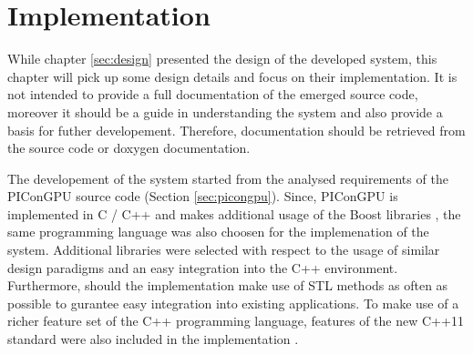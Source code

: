 \chapter{Implementation}
\label{sec:implementation}


While chapter \ref{sec:design} presented the design of the developed
system, this chapter will pick up some design details and focus on
their implementation.  It is not intended to provide a full
documentation of the emerged source code, moreover it should be a
guide in understanding the system and also provide a basis for futher
developement. Therefore, documentation should be retrieved from the
source code or doxygen \cite{ref:doxygen} documentation.

The developement of the system started from the analysed requirements
of the PIConGPU source code (Section \ref{sec:picongpu}). Since,
PIConGPU is implemented in C / C++ and makes additional usage of the
Boost libraries \cite{ref:boost}, the same programming language was
also choosen for the implemenation of the system. Additional libraries
were selected with respect to the usage of similar design paradigms
and an easy integration into the C++ environment. Furthermore, should
the implementation make use of STL methods as often as possible to
gurantee easy integration into existing applications.  To make use of
a richer feature set of the C++ programming language, features of the
new C++11 standard were also included in the implementation
\cite{ref:c++11}.

